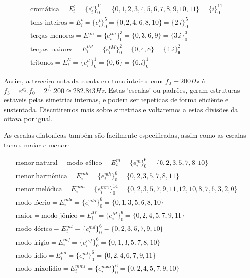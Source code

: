 \begin{equation}
\begin{split}
\text{cromática} = E_i^c = \{e_i^c\}_0^{11} =  \{0,1,2,3,4,5,6,7,8,9,10,11\} = \{i\}_0^{11}\\
\text{tons inteiros} = E_i^t = \{e_i^t\}_0^{5} = \{0,2,4,6,8,10\} = \{2.i\}_0^{5} \\
\text{terças menores} = E_i^{tm} = \{e_i^{tm}\}_0^{3} = \{0,3,6,9\} = \{3.i\}_0^3 \\
\text{terças maiores} = E_i^{tM} = \{e_i^{tM}\}_0^{2} = \{0,4,8\} = \{4.i\}_0^2\\
\text{trítonos} = E_i^{tt} = \{e_i^{tt}\}_0^{1} = \{ 0, 6 \} = \{6.i\}_0^1
\end{split}
\end{equation}

Assim, a terceira nota da escala em tons inteiros com $f_0=200Hz$
é $f_3=\varepsilon^{e_3^t} . f_0 = 2^{\frac{6}{12}} . 200 \approxeq 282.843 Hz$. Estas
'escalas' ou padrões, geram estruturas estáveis pelas simetrias internas, e podem ser
repetidas de forma eficiênte e sustentada. Discutiremos mais sobre simetrias e voltaremos
a estas divisões da oitava por igual.

As escalas diatonicas também são facilmente especificadas, assim como
as escalas tonais maior e menor:


\begin{equation}
\begin{split}
\text{menor natural} = \text{modo eólico} = E_i^m = \{e_i^m\}_0^6 = \{0,2,3,5,7,8,10\} \\
\text{menor harmônica} = E_i^{mh} = \{e_i^{mh}\}_0^6 = \{0,2,3,5,7,8,11\} \\
\text{menor melódica} = E_i^{mm} = \{e_i^{mm}\}_0^{14} = \{0,2,3,5,7,9,11,12,10,8,7,5,3,2,0\} \\
\text{modo lócrio} = E_i^{mlo} = \{e_i^{mlo}\}_0^6 = \{0,1,3,5,6,8,10\} \\ 
\text{maior} = \text{modo jônico} = E_i^M = \{e_i^M\}_0^6 = \{0,2,4,5,7,9,11\} \\
\text{modo dórico} = E_i^{md} = \{e_i^{md}\}_0^6 = \{0,2,3,5,7,9,10\} \\
\text{modo frígio} = E_i^{mf} = \{e_i^{mf}\}_0^6 = \{0,1,3,5,7,8,10\} \\
\text{modo lídio} = E_i^{ml}=\{e_i^{ml}\}_0^6 = \{0,2,4,6,7,9,11\} \\
\text{modo mixolídio} = E_i^{mmi} = \{e_i^{mmi}\}_0^6 = \{0,2,4,5,7,9,10\}
\end{split}
\end{equation}

